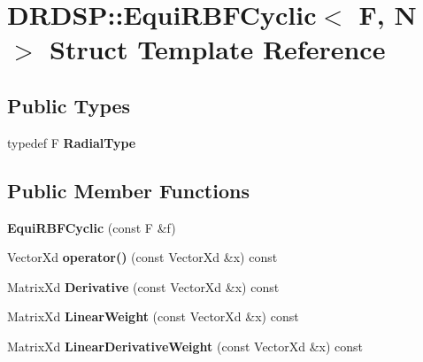\hypertarget{struct_d_r_d_s_p_1_1_equi_r_b_f_cyclic}{\section{D\-R\-D\-S\-P\-:\-:Equi\-R\-B\-F\-Cyclic$<$ F, N $>$ Struct Template Reference}
\label{struct_d_r_d_s_p_1_1_equi_r_b_f_cyclic}
}
\subsection*{Public Types}
\begin{DoxyCompactItemize}
\item 
\hypertarget{struct_d_r_d_s_p_1_1_equi_r_b_f_cyclic_a4e0cd623b4aa759873ee402f2a0990a6}{typedef F {\bfseries Radial\-Type}}\label{struct_d_r_d_s_p_1_1_equi_r_b_f_cyclic_a4e0cd623b4aa759873ee402f2a0990a6}

\end{DoxyCompactItemize}
\subsection*{Public Member Functions}
\begin{DoxyCompactItemize}
\item 
\hypertarget{struct_d_r_d_s_p_1_1_equi_r_b_f_cyclic_a800d640944e8c1656141faf6092da51b}{{\bfseries Equi\-R\-B\-F\-Cyclic} (const F \&f)}\label{struct_d_r_d_s_p_1_1_equi_r_b_f_cyclic_a800d640944e8c1656141faf6092da51b}

\item 
\hypertarget{struct_d_r_d_s_p_1_1_equi_r_b_f_cyclic_a0fc5d741bb0d61b57f77342ae92badca}{Vector\-Xd {\bfseries operator()} (const Vector\-Xd \&x) const }\label{struct_d_r_d_s_p_1_1_equi_r_b_f_cyclic_a0fc5d741bb0d61b57f77342ae92badca}

\item 
\hypertarget{struct_d_r_d_s_p_1_1_equi_r_b_f_cyclic_aa3d163e34f00f5bcf09dbd79d78b04fc}{Matrix\-Xd {\bfseries Derivative} (const Vector\-Xd \&x) const }\label{struct_d_r_d_s_p_1_1_equi_r_b_f_cyclic_aa3d163e34f00f5bcf09dbd79d78b04fc}

\item 
\hypertarget{struct_d_r_d_s_p_1_1_equi_r_b_f_cyclic_a2b869652866dfe11d89cea4d0e712e35}{Matrix\-Xd {\bfseries Linear\-Weight} (const Vector\-Xd \&x) const }\label{struct_d_r_d_s_p_1_1_equi_r_b_f_cyclic_a2b869652866dfe11d89cea4d0e712e35}

\item 
\hypertarget{struct_d_r_d_s_p_1_1_equi_r_b_f_cyclic_a5d2da45df91a08420e07c91ebdfca0b5}{Matrix\-Xd {\bfseries Linear\-Derivative\-Weight} (const Vector\-Xd \&x) const }\label{struct_d_r_d_s_p_1_1_equi_r_b_f_cyclic_a5d2da45df91a08420e07c91ebdfca0b5}

\end{DoxyCompactItemize}
